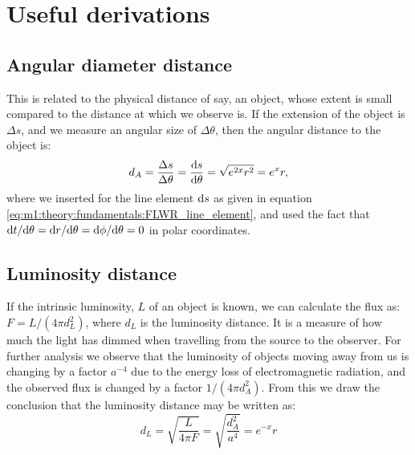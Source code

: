 \appendix

\section{Useful derivations}\label{app:derivations}
    \subsection{Angular diameter distance}
        This is related to the physical distance of say, an object, whose extent is small compared to the distance at which we observe is. If the extension of the object is $\Delta s$, and we measure an angular size of $\Delta\theta$, then the angular distance to the object is:
        \begin{equation}\label{eq:app:derivations:angular_distance}
            d_A = \frac{\Delta s}{\Delta\theta} = \frac{\mathrm{d} s}{\mathrm{d}\theta} = \sqrt{e^{2x}r^2} = e^xr,
        \end{equation}
        where we inserted for the line element $\mathrm{d} s$ as given in equation \cref{eq:m1:theory:fundamentals:FLWR_line_element}, and used the fact that $\mathrm{d} t/\mathrm{d} \theta = \mathrm{d} r/\mathrm{d}\theta = \mathrm{d}\phi/\mathrm{d}\theta  = 0$ in polar coordinates. 

    \subsection{Luminosity distance}
        If the intrinsic luminosity, $L$ of an object is known, we can calculate the flux as: $F=L/(4\pi d_L^2)$, where $d_L$ is the luminosity distance. It is a measure of how much the light has dimmed when travelling from the source to the observer. For further analysis we observe that the luminosity of objects moving away from us is changing by a factor $a^{-4}$ due to the energy loss of electromagnetic radiation, and the observed flux is changed by a factor $1/(4\pi d_A^2)$. From this we draw the conclusion that the luminosity distance may be written as:
        \begin{equation}
            d_L = \sqrt{\frac{L}{4\pi F}} = \sqrt{\frac{d_A^2}{a^4}} = e^{-x}r 
        \end{equation}

